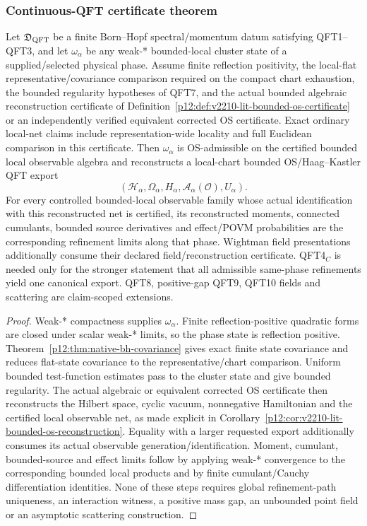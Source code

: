 \documentclass[12pt,a4paper]{article}
\begin{document}
\subsubsection{Continuous-QFT certificate theorem}
\label{p12:sec:continuous-qft-reconstruction-theorem}
\begin{theorem}
\label{p12:thm:main-qft}
Let \(\mathfrak D_{\rm QFT}\) be a finite Born--Hopf spectral/momentum datum satisfying QFT1--QFT3, and let \(\omega_\alpha\) be any weak-* bounded-local cluster state of a supplied/selected physical phase.  Assume finite reflection positivity, the local-flat representative/covariance comparison required on the compact chart exhaustion, the bounded regularity hypotheses of QFT7, and the actual bounded algebraic reconstruction certificate of Definition~\ref{p12:def:v2210-lit-bounded-os-certificate} or an independently verified equivalent corrected OS certificate. Exact ordinary local-net claims include representation-wide locality and full Euclidean comparison in this certificate. Then \(\omega_\alpha\) is OS-admissible on the certified bounded local observable algebra and reconstructs a local-chart bounded OS/Haag--Kastler QFT export
\[
 (\mathcal H_\alpha,\Omega_\alpha,H_\alpha,\mathcal A_\alpha(\mathcal O),U_\alpha).
\]
For every controlled bounded-local observable family whose actual identification with this reconstructed net is certified, its reconstructed moments, connected cumulants, bounded source derivatives and effect/POVM probabilities are the corresponding refinement limits along that phase. Wightman field presentations additionally consume their declared field/reconstruction certificate.  QFT4$_C$ is needed only for the stronger statement that all admissible same-phase refinements yield one canonical export.  QFT8, positive-gap QFT9, QFT10 fields and scattering are claim-scoped extensions.
\end{theorem}
\begin{proof}
Weak-* compactness supplies \(\omega_\alpha\).  Finite reflection-positive quadratic forms are closed under scalar weak-* limits, so the phase state is reflection positive.  Theorem~\ref{p12:thm:native-bh-covariance} gives exact finite state covariance and reduces flat-state covariance to the representative/chart comparison.  Uniform bounded test-function estimates pass to the cluster state and give bounded regularity.  The actual algebraic or equivalent corrected OS certificate then reconstructs the Hilbert space, cyclic vacuum, nonnegative Hamiltonian and the certified local observable net, as made explicit in Corollary~\ref{p12:cor:v2210-lit-bounded-os-reconstruction}. Equality with a larger requested export additionally consumes its actual observable generation/identification.  Moment, cumulant, bounded-source and effect limits follow by applying weak-* convergence to the corresponding bounded local products and by finite cumulant/Cauchy differentiation identities.  None of these steps requires global refinement-path uniqueness, an interaction witness, a positive mass gap, an unbounded point field or an asymptotic scattering construction.
\end{proof}
\end{document}
